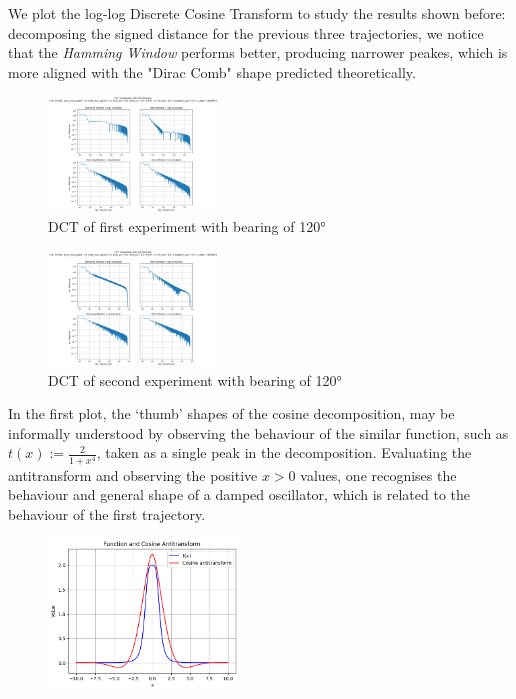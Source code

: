 \documentclass[11pt, twocolumn]{article}
\begin{document}
        We plot the log-log Discrete Cosine Transform to study the results shown before: decomposing the signed distance for the previous three trajectories, we notice that the \textit{Hamming Window} performs better, producing narrower peakes, which is more aligned with the "Dirac Comb" shape predicted theoretically.
        \begin{figure}[H]
          \centering
          \includegraphics[width=0.40\textwidth]{figures/dct_120_loglog.png}
          \caption{DCT of first experiment with bearing of 120°}
          \label{fig:dct1}
        \end{figure}

        \begin{figure}[H]
          \centering
          \includegraphics[width=0.40\textwidth]{figures/dct_240_loglog.png}
          \caption{DCT of second experiment with bearing of 120°}
          \label{fig:dct2}
        \end{figure}

        In the first plot, the `thumb' shapes of the cosine decomposition, may be informally understood by observing the behaviour of the similar function, such as $t(x) := \frac{2}{1+x^4}$, taken as a single peak in the decomposition. Evaluating the antitransform and observing the positive $x>0$ values, one recognises the behaviour and general shape of a damped oscillator, which is related to the behaviour of the first trajectory.

        \begin{figure}[H]
          \centering
          \includegraphics[width=0.45\textwidth]{figures/f_and_cos_antitr.png}
          \label{fig:antitransform}
        \end{figure}
\end{document}
